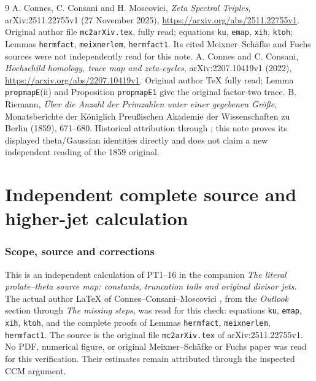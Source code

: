 \documentclass[11pt]{article}
\begin{document}
\begin{thebibliography}{9}
 A. Connes, C. Consani and H. Moscovici,
\emph{Zeta Spectral Triples}, arXiv:2511.22755v1 (27 November 2025),
\url{https://arxiv.org/abs/2511.22755v1}.
Original author file \texttt{mc2arXiv.tex}, fully read;
equations \texttt{ku}, \texttt{emap}, \texttt{xih}, \texttt{ktoh};
Lemmas \texttt{hermfact}, \texttt{meixnerlem}, \texttt{hermfact1}.
Its cited Meixner--Sch\"afke and Fuchs sources were not independently
read for this note.
 A. Connes and C. Consani,
\emph{Hochschild homology, trace map and zeta-cycles},
arXiv:2207.10419v1 (2022),
\url{https://arxiv.org/abs/2207.10419v1}.
Original author TeX fully read; Lemma \texttt{propmapE}(ii) and
Proposition \texttt{propmapE1} give the original factor-two trace.
 B. Riemann,
\emph{\"Uber die Anzahl der Primzahlen unter einer gegebenen Gr\"o\ss e},
Monatsberichte der K\"oniglich Preu\ss ischen Akademie der
Wissenschaften zu Berlin (1859), 671--680.
Historical attribution through \cite{swtheta:CCM}; this note proves its
displayed theta/Gaussian identities directly and does not claim a
new independent reading of the 1859 original.
\end{thebibliography}

\endgroup

\clearpage\begingroup
\part*{Independent complete source and higher-jet calculation}
\newcommand{\swjetsR}{\mathbb R}\newcommand{\swjetsC}{\mathbb C}


\section{Scope, source and corrections}
This is an independent calculation of PT1--16 in the companion
\emph{The literal prolate--theta source map: constants, truncation tails and original divisor jets}.
The actual author LaTeX of Connes--Consani--Moscovici \cite{swjets:CCM},
from the \emph{Outlook} section through \emph{The missing steps},
was read for this check: equations \texttt{ku}, \texttt{emap},
\texttt{xih}, \texttt{ktoh}, and the complete proofs of Lemmas
\texttt{hermfact}, \texttt{meixnerlem}, \texttt{hermfact1}.
The source is the original file \texttt{mc2arXiv.tex} of
arXiv:2511.22755v1. No PDF, numerical figure, or original
Meixner--Sch\"afke or Fuchs paper was read for this verification.
Their estimates remain attributed through the inspected CCM argument.
\end{document}
